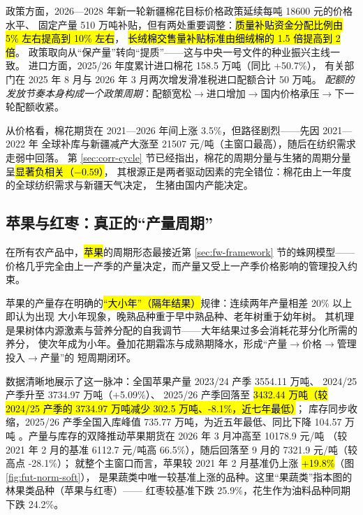 政策方面，2026---2028 年新一轮新疆棉花目标价格政策延续每吨 18600 元的价格水平、
固定产量 510 万吨补贴，但有两处重要调整：\hl{质量补贴资金分配比例由 5\% 左右提高到 10\% 左右}，
\hl{长绒棉交售量补贴标准由细绒棉的 1.5 倍提高到 2 倍}\cite{xj2026cottonpolicy}。
政策取向从“保产量”转向“提质”——这与中央一号文件的种业振兴主线一致\cite{cccp2025doc1}。
进口方面，2025/26 年度累计进口棉花 158.5 万吨（同比 +50.7\%），
有关部门在 2025 年 8 月与 2026 年 3 月两次增发滑准税进口配额合计 50 万吨\cite{jinqiao2026cotton}。
\emph{配额的发放节奏本身构成一个政策周期}：配额宽松$\to$进口增加$\to$国内价格承压$\to$下一轮配额收紧。

从价格看，棉花期货在 2021---2026 年间上涨 3.5\%，但路径剧烈——先因 2021---2022 年
全球补库与新疆减产大涨至 21507 元/吨（主窗口最高），随后在纺织需求走弱中回落。
第 \ref{sec:corr-cycle} 节已经指出，棉花的周期分量与生猪的周期分量呈\hl{显著负相关（$-0.59$）}，
其根源正是两者驱动因素的完全错位：棉花由上一年度的全球纺织需求与新疆天气决定，
生猪由国内产能决定。

\subsection{苹果与红枣：真正的“产量周期”}
\label{sec:soft-fruit}

在所有农产品中，\hl{苹果}的周期形态最接近第 \ref{sec:fw-framework} 节的蛛网模型——
价格几乎完全由上一产季的产量决定，而产量又受上一产季价格影响的管理投入约束。

苹果的产量存在明确的\hl{“大小年”（隔年结果）}规律：连续两年产量相差 20\% 以上即认为出现
大小年现象，晚熟品种重于早中熟品种、老年树重于幼年树\cite{cma2015fruit}。
其机理是果树体内源激素与营养分配的自我调节——大年结果过多会消耗花芽分化所需的养分，
使次年成为小年。叠加花期霜冻与成熟期降水，形成“产量$\to$价格$\to$管理投入$\to$产量”的
短周期闭环。

数据清晰地展示了这一脉冲：全国苹果产量 2023/24 产季 3554.11 万吨\cite{fzzq2026apple}、
2024/25 产季升至 3734.97 万吨（+5.09\%）、
2025/26 产季回落至 \hl{3432.44 万吨（较 2024/25 产季的 3734.97 万吨减少 302.5 万吨、-8.1\%，近七年最低）}\cite{fzzq2026apple}；
库存同步收缩，2025/26 产季全国入库峰值 735.77 万吨，为近五年最低、同比下降 104.57 万吨
\cite{fzzq2026apple}。产量与库存的双降推动苹果期货在 2026 年 3 月冲高至 \num{10178.9} 元/吨
（较 2021 年 2 月的基准 \num{6112.7} 元/吨高 66.5\%），随后回落至 9 月的 \num{7321.9} 元/吨（较高点 -28.1\%）；
就整个主窗口而言，苹果较 2021 年 2 月基准仍上涨 \hl{+19.8\%}（图 \ref{fig:fut-norm-soft}），
是果蔬类中唯一较基准上涨的品种。这里“果蔬类”指本图的林果类品种（苹果与红枣）——
红枣较基准下跌 25.9\%，花生作为油料品种同期下跌 24.2\%。

